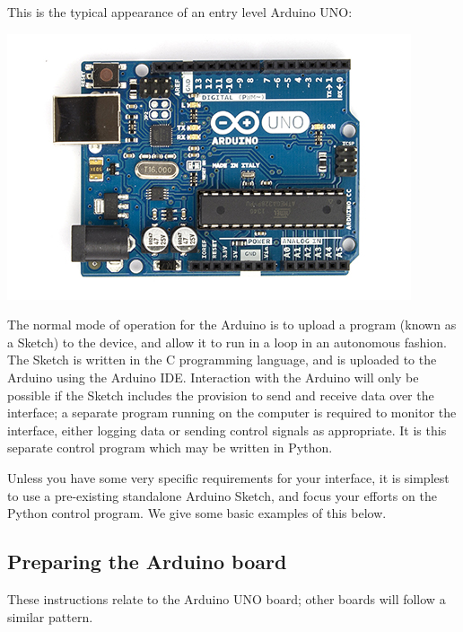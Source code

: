 \documentclass[10pt]{article}
\begin{document}
This is the typical appearance of an entry level Arduino UNO:

\includegraphics[scale=1.5]{ArduinoUno.jpg}

The normal mode of operation for the Arduino is to upload a program
(known as a Sketch) to the device, and allow it to run in a loop in an
autonomous fashion. The Sketch is written in the C programming language,
and is uploaded to the Arduino using the Arduino IDE. Interaction with
the Arduino will only be possible if the Sketch includes the provision
to send and receive data over the interface; a separate program running
on the computer is required to monitor the interface, either logging
data or sending control signals as appropriate. It is this separate
control program which may be written in Python.

Unless you have some very specific requirements for your interface, it
is simplest to use a pre-existing standalone Arduino Sketch, and focus
your efforts on the Python control program. We give some basic examples
of this below.

    \hypertarget{a.3-preparing-the-arduino-board}{%
\subsection{Preparing the Arduino
board}\label{a.3-preparing-the-arduino-board}}

These instructions relate to the Arduino UNO board; other boards will
follow a similar pattern.
\end{document}
